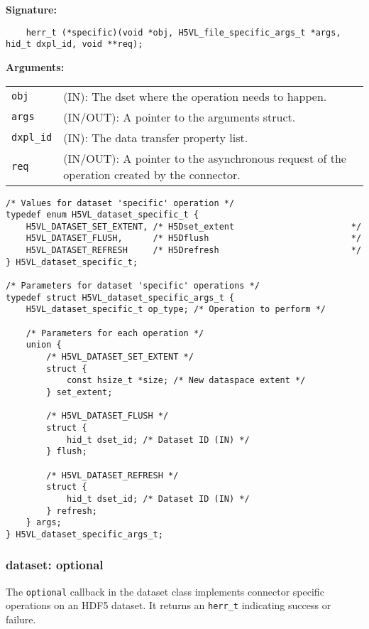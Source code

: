 \begin{mdframed}[style=bgbox]
\textbf{Signature:}
\begin{lstlisting}
    herr_t (*specific)(void *obj, H5VL_file_specific_args_t *args, hid_t dxpl_id, void **req);
\end{lstlisting}

\textbf{Arguments:}\\
\begin{tabular}{l p{13.5cm}}
  \texttt{obj} & (IN): The dset  where the operation needs
  to happen.\\
  \texttt{args} & (IN/OUT): A pointer to the arguments struct.\\
  \texttt{dxpl\_id} & (IN): The data transfer property list.\\
  \texttt{req} & (IN/OUT): A pointer to the asynchronous request of the
  operation created by the connector.\\
\end{tabular}
\end{mdframed}

\begin{lstlisting}
/* Values for dataset 'specific' operation */
typedef enum H5VL_dataset_specific_t {
    H5VL_DATASET_SET_EXTENT, /* H5Dset_extent                       */
    H5VL_DATASET_FLUSH,      /* H5Dflush                            */
    H5VL_DATASET_REFRESH     /* H5Drefresh                          */
} H5VL_dataset_specific_t;

/* Parameters for dataset 'specific' operations */
typedef struct H5VL_dataset_specific_args_t {
    H5VL_dataset_specific_t op_type; /* Operation to perform */

    /* Parameters for each operation */
    union {
        /* H5VL_DATASET_SET_EXTENT */
        struct {
            const hsize_t *size; /* New dataspace extent */
        } set_extent;

        /* H5VL_DATASET_FLUSH */
        struct {
            hid_t dset_id; /* Dataset ID (IN) */
        } flush;

        /* H5VL_DATASET_REFRESH */
        struct {
            hid_t dset_id; /* Dataset ID (IN) */
        } refresh;
    } args;
} H5VL_dataset_specific_args_t;
\end{lstlisting}

\subsubsection{dataset: optional}
The \texttt{optional} callback in the dataset class implements connector specific operations on an HDF5 dataset. It returns an \texttt{herr\_t} indicating success or failure. \bigskip

